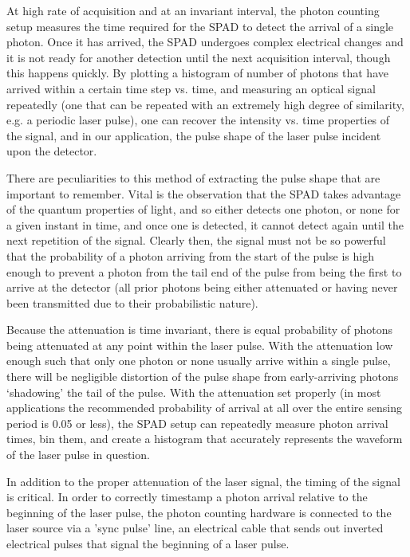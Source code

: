 \documentclass[a4paper]{article}
\begin{document}
At high rate of acquisition and at an invariant interval, the photon counting setup measures the time required for the SPAD to detect the arrival of a single photon. Once it has arrived, the SPAD undergoes complex electrical changes and it is not ready for another detection until the next acquisition interval, though this happens quickly. By plotting a histogram of number of photons that have arrived within a certain time step vs. time, and measuring an optical signal repeatedly (one that can be repeated with an extremely high degree of similarity, e.g. a periodic laser pulse), one can recover the intensity vs. time properties of the signal, and in our application, the pulse shape of the laser pulse incident upon the detector.

There are peculiarities to this method of extracting the pulse shape that are important to remember. Vital is the observation that the SPAD takes advantage of the quantum properties of light, and so either detects one photon, or none for a given instant in time, and once one is detected, it cannot detect again until the next repetition of the signal. Clearly then, the signal must not be so powerful that the probability of a photon arriving from the start of the pulse is high enough to prevent a photon from the tail end of the pulse from being the first to arrive at the detector (all prior photons being either attenuated or having never been transmitted due to their probabilistic nature).

Because the attenuation is time invariant, there is equal probability of photons being attenuated at any point within the laser pulse. With the attenuation low enough such that only one photon or none usually arrive within a single pulse, there will be negligible distortion of the pulse shape from early-arriving photons ‘shadowing’ the tail of the pulse. With the attenuation set properly (in most applications the recommended probability of arrival at all over the entire sensing period is 0.05 or less), the SPAD setup can repeatedly measure photon arrival times, bin them, and create a histogram that accurately represents the waveform of the laser pulse in question.

In addition to the proper attenuation of the laser signal, the timing of the signal is critical. In order to correctly timestamp a photon arrival relative to the beginning of the laser pulse, the photon counting hardware is connected to the laser source via a 'sync pulse' line, an electrical cable that sends out inverted electrical pulses that signal the beginning of a laser pulse.
\end{document}
